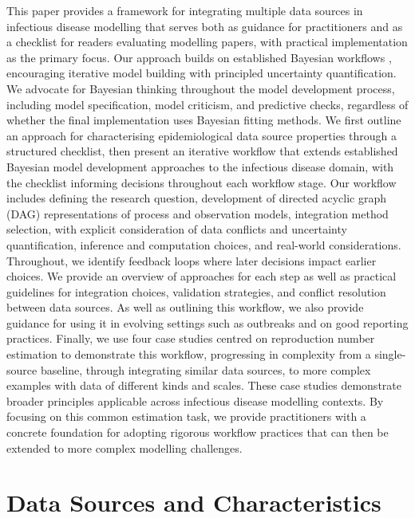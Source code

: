 \documentclass{article}
\begin{document}
This paper provides a framework for integrating multiple data sources in infectious disease modelling that serves both as guidance for practitioners and as a checklist for readers evaluating modelling papers, with practical implementation as the primary focus. 
Our approach builds on established Bayesian workflows \citep{gelman2020bayesian}, encouraging iterative model building with principled uncertainty quantification. We advocate for Bayesian thinking throughout the model development process, including model specification, model criticism, and predictive checks, regardless of whether the final implementation uses Bayesian fitting methods. 
We first outline an approach for characterising epidemiological data source properties through a structured checklist, then present an iterative workflow that extends established Bayesian model development approaches to the infectious disease domain, with the checklist informing decisions throughout each workflow stage. 
Our workflow includes defining the research question, development of directed acyclic graph (DAG) representations of process and observation models, integration method selection, with explicit consideration of data conflicts and uncertainty quantification, inference and computation choices, and real-world considerations. Throughout, we identify feedback loops where later decisions impact earlier choices. 
We provide an overview of approaches for each step as well as practical guidelines for integration choices, validation strategies, and conflict resolution between data sources. 
As well as outlining this workflow, we also provide guidance for using it in evolving settings such as outbreaks and on good reporting practices.
Finally, we use four case studies centred on reproduction number estimation to demonstrate this workflow, progressing in complexity from a single-source baseline, through integrating similar data sources, to more complex examples with data of different kinds and scales. 
These case studies demonstrate broader principles applicable across infectious disease modelling contexts. 
By focusing on this common estimation task, we provide practitioners with a concrete foundation for adopting rigorous workflow practices that can then be extended to more complex modelling challenges.

\section{Data Sources and Characteristics} \label{sec:datareview}
\end{document}
